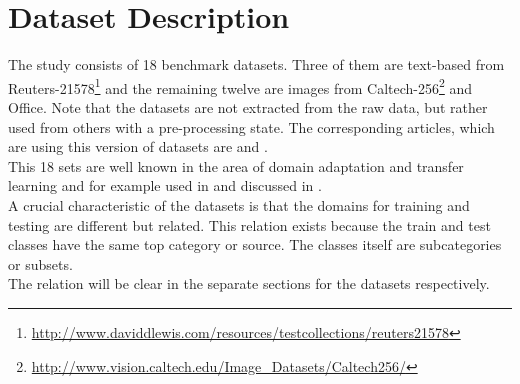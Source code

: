 \section{Dataset Description}\label{EmSecDaDes}
The study consists of 18 benchmark datasets.
Three of them are text-based from Reuters-21578\footnote{\url{http://www.daviddlewis.com/resources/testcollections/reuters21578}} and the remaining twelve are images from Caltech-256\footnote{\url{http://www.vision.caltech.edu/Image\_Datasets/Caltech256/}} and Office.
Note that the datasets are not extracted from the raw data, but rather used from others with a pre-processing state.
The corresponding articles, which are using this version of datasets are \cite{Gong.} and \cite{Long.2015}.
\\
This 18 sets are well known in the area of domain adaptation and transfer learning and for example used in 
\cite{Long.2015}\cite{Gong.}\cite{Fernando.}\cite{Long.}\cite{Dai.}\cite{Quattoni.} and discussed in \cite{Pan.2010}.\\
A crucial characteristic of the datasets is that the domains for training and testing are different but related.
This relation exists because the train and test classes have the same top category or source.
The classes itself are subcategories or subsets.\cite{JingGao.2008}\\
The relation will be clear in the separate sections for the datasets respectively.

